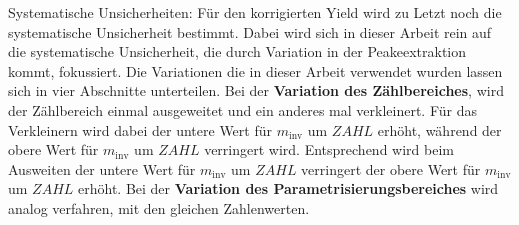 Systematische Unsicherheiten:
Für den korrigierten Yield wird zu Letzt noch die systematische Unsicherheit bestimmt.
Dabei wird sich in dieser Arbeit rein auf die systematische Unsicherheit, die durch Variation in der Peakeextraktion kommt, fokussiert.
Die Variationen die in dieser Arbeit verwendet wurden lassen sich in vier Abschnitte unterteilen.
Bei der \textbf{Variation des Zählbereiches}, wird der Zählbereich einmal ausgeweitet und ein anderes mal verkleinert.
Für das Verkleinern wird dabei der untere Wert für $m_\text{inv}$ um $ZAHL$ erhöht, während der obere Wert für $m_\text{inv}$ um $ZAHL$ verringert wird.
Entsprechend wird beim Ausweiten der untere Wert für $m_\text{inv}$ um $ZAHL$ verringert der obere Wert für $m_\text{inv}$ um $ZAHL$ erhöht.
Bei der \textbf{Variation des Parametrisierungsbereiches} wird analog verfahren, mit den gleichen Zahlenwerten.
\newline
